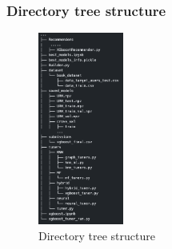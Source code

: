 \documentclass{beamer}
\begin{document}
\begin{frame}
  \frametitle{Directory tree structure}
  \begin{figure}
      \centering
      \includegraphics[width=0.25\textwidth]{tree_structure.png}
      \caption{Directory tree structure}
  \end{figure}
\end{frame}
\end{document}

